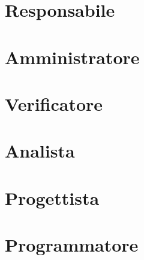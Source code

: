 \documentclass[a4paper, 12pt]{article}
\begin{document}
\copertina{}

\newpage

\setcounter{tocdepth}{2}
\tableofcontents
\newpage

\newpage

\section{Responsabile}





\section{Amministratore}



\section{Verificatore}




\section{Analista}


\section{Progettista}


\section{Programmatore}

\end{document}
